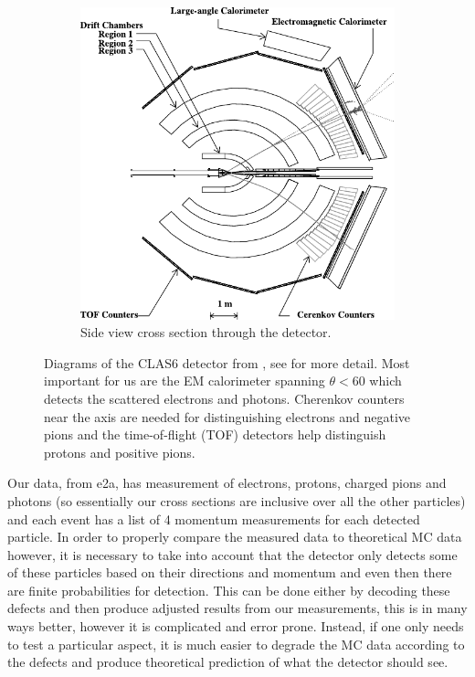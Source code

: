 \documentclass[a4paper,12pt]{article}
\begin{document}
\begin{figure}[h]
\begin{subfigure}[b]{0.5\textwidth}
        \includegraphics[width=\textwidth]{figures/CLAS_side.pdf}
        \caption{Side view cross section through the detector.}
    \end{subfigure}
    \caption{\label{fig:CLAS}
        Diagrams of the CLAS6 detector from \cite{meckingCEBAFLargeAcceptance2003}, see for more detail.
        Most important for us are the EM calorimeter spanning $\theta < 60$ which detects the scattered electrons and photons.
        Cherenkov counters near the axis are needed for distinguishing electrons and negative pions and the time-of-flight (TOF) detectors help distinguish protons and positive pions.
    }
\end{figure}

Our data, from e2a, has measurement of electrons, protons, charged pions and photons (so essentially our cross sections are inclusive over all the other particles) and each event has a list of 4 momentum measurements for each detected particle.
In order to properly compare the measured data to theoretical MC data however, it is necessary to take into account that the detector only detects some of these particles based on their directions and momentum and even then there are finite probabilities for detection.
This can be done either by decoding these defects and then produce adjusted results from our measurements, this is in many ways better, however it is complicated and error prone.
Instead, if one only needs to test a particular aspect, it is much easier to degrade the MC data according to the defects and produce theoretical prediction of what the detector should see.
\end{document}
